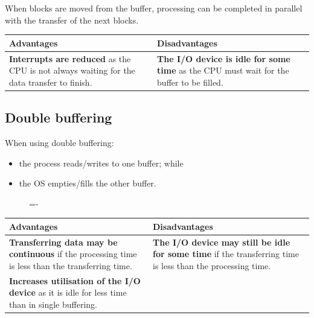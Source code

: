 \documentclass[a4paper]{systems-software}
\begin{document}
When blocks are moved from the buffer, processing can be completed in parallel with the transfer of the next blocks.

\begin{longtabu} to \textwidth {| X[1,l] | X[1,l] |}
    \hline
    \textbf{Advantages} & \textbf{Disadvantages}
	\\ \hline
	\textbf{Interrupts are reduced} as the CPU is not always waiting for the data transfer to finish. &
	\textbf{The I/O device is idle for some time} as the CPU must wait for the buffer to be filled.
	\\ \hline
\end{longtabu}


\subsection*{Double buffering}

When using double buffering:
\begin{itemize}
	\item the process reads/writes to one buffer; while
	\item the OS empties/fills the other buffer.
\end{itemize}

\begin{figure}[H]
  \lineskip=-\fboxrule
\end{figure}

\begin{longtabu} to \textwidth {| X[1,l] | X[1,l] |}
    \hline
    \textbf{Advantages} & \textbf{Disadvantages}
	\\ \hline
	\textbf{Transferring data may be continuous} if the processing time is less than the transferring time. &
	\textbf{The I/O device may still be idle for some time} if the transferring time is less than the processing time.
	\\ \hline
	\textbf{Increases utilisation of the I/O device} as it is idle for less time than in single buffering. &
	\\ \hline
\end{longtabu}
\end{document}
